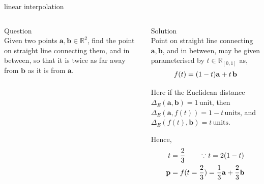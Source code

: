 \documentclass[aspectratio=169,xcolor={dvipsnames,svgnames}]{beamer}
\begin{document}
\begin{frame}[label={sec:orgf934f80}]{linear interpolation}
\begin{columns}
\begin{column}{.3\columnwidth}
\alert{Question} \\[0pt]
Given two points \(\mathbf{a},\mathbf{b} \in
\mathbb{R}^2\), find the point on straight line
connecting them, and in between, so that it is twice as
far away from \(\mathbf{b}\) as it is from \(\mathbf{a}\).
\end{column}

\begin{column}{.7\columnwidth}
\alert{Solution} \\[0pt]
Point on straight line connecting
\(\mathbf{a},\mathbf{b}\), and in between, may be given
parameterised by \(t\in\mathbb{R}_{[0,1]}\) as,
\begin{align}
  \notag
  f(t) = (1-t)\mathbf{a} + t\,\mathbf{b}
\end{align}

Here if the Euclidean distance \(\Delta_E (\mathbf{a},
\mathbf{b}) = 1\,\mathrm{unit}\), then \(\Delta_E
(\mathbf{a}, f(t)) = 1-t\,\mathrm{units}\), and
\(\Delta_E (f(t), \mathbf{b}) = t\,\mathrm{units}\).

Hence,
\begin{align}
  \notag
  t &= \frac23 \qquad \because t = 2(1-t) \\
  \notag
  \mathbf{p} &= f(t=\frac23) =
               \frac13\mathbf{a} + \frac23\mathbf{b}
\end{align}
\end{column}
\end{columns}
\end{frame}
\end{document}
